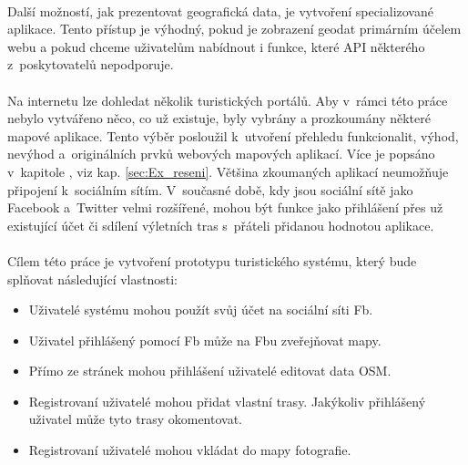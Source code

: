 \documentclass[11pt,a4paper,titlepage,oneside]{book}
\begin{document}
	\paragraph{}Další možností, jak prezentovat geografická data, je vytvoření specializované aplikace. Tento přístup je výhodný, pokud je zobrazení geodat primárním účelem webu a pokud chceme uživatelům nabídnout i funkce, které \ac{API} některého z~poskytovatelů nepodporuje. 



	\paragraph{} Na internetu lze dohledat několik turistických portálů. Aby v~rámci této práce nebylo vytvářeno něco, co už existuje, byly vybrány a prozkoumány některé mapové aplikace. Tento výběr posloužil k~utvoření přehledu funkcionalit, výhod, nevýhod a~originálních prvků webových mapových aplikací. Více je popsáno v~kapitole , viz kap. \ref{sec:Ex_reseni}. Většina zkoumaných aplikací neumožňuje připojení k~sociálním sítím. V~současné době, kdy jsou sociální sítě jako Facebook a~Twitter velmi rozšířené, mohou být funkce jako přihlášení přes už existující účet či sdílení výletních tras s~přáteli přidanou hodnotou aplikace. 


	\paragraph{} Cílem této práce je vytvoření prototypu turistického systému, který bude splňovat následující vlastnosti:
		\begin{itemize}
			\item Uživatelé systému mohou použít svůj účet na sociální síti \ac{Fb}.
			\item Uživatel přihlášený pomocí \ac{Fb} může na \acl{Fb}u zveřejňovat mapy.
			\item Přímo ze stránek mohou přihlášení uživatelé editovat data \ac{OSM}.
			\item Registrovaní uživatelé mohou přidat vlastní trasy. Jakýkoliv přihlášený uživatel může tyto trasy okomentovat.
			\item Registrovaní uživatelé mohou vkládat do mapy fotografie.
		\end{itemize}
\end{document}
